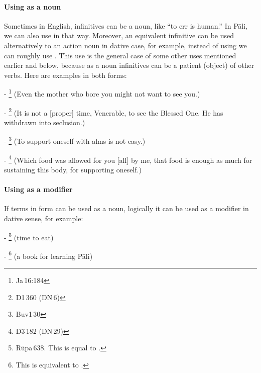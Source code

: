 \paragraph*{Using as a noun} Sometimes in English, infinitives can be a noun, like ``to err is human.'' In P\=ali, we can also use in that way. Moreover, an equivalent infinitive can be used alternatively to an action noun in dative case, for example, instead of using  we can roughly use . This use is the general case of some other uses mentioned earlier and below, because as a noun infinitives can be a patient (object) of other verbs. Here are examples in both forms:\par
- \footnote{Ja\,16:184} (Even the mother who bore you might not want to see you.)\par
- \footnote{D1\,360 (DN\,6)} (It is not a [proper] time, Venerable, to see the Blessed One. He has withdrawn into seclusion.)\par
- \footnote{Buv1\,30} (To support oneself with alms is not easy.)\par
- \footnote{D3\,182 (DN\,29)} (Which food was allowed for you [all] by me, that food is enough as much for sustaining this body, for supporting oneself.)\par

\paragraph*{Using as a modifier} If terms in  form can be used as a noun, logically it can be used as a modifier in dative sense, for example:\par
- \footnote{R\=upa\,638. This is equal to .} (time to eat)\par
- \footnote{This is equivalent to .} (a book for learning P\=ali)\par

